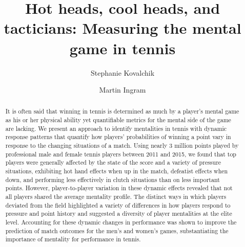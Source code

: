 \documentclass{Latex/svjour3}
\begin{document}
\title{Hot heads, cool heads, and tacticians: Measuring the mental game in
  tennis}



\author{Stephanie Kovalchik\and Martin Ingram}


\date{}

\maketitle

\begin{abstract}

It is often said that winning in tennis is determined as much by a player's
mental game as his or her physical ability yet quantifiable metrics for the
mental side of the game are lacking. We present an approach to identify
mentalities in tennis with dynamic response patterns that quantify how players'
probabilities of winning a point vary in response to the changing situations of
a match. Using nearly 3 million points played by professional male and female
tennis players between 2011 and 2015, we found that top players were generally
affected by the state of the score and a variety of pressure situations,
exhibiting hot hand effects when up in the match, defeatist effects when down,
and performing less effectively in clutch situations than on less important
points. However, player-to-player variation in these dynamic effects revealed
that not all players shared the average mentality profile. The distinct ways in
which players deviated from the field highlighted a variety of differences in
how players respond to pressure and point history and suggested a diversity of
player mentalities at the elite level. Accounting for these dynamic changes in
performance was shown to improve the prediction of match outcomes for the men's
and women's games, substantiating the importance of mentality for performance in
tennis.


\end{abstract}
\end{document}
